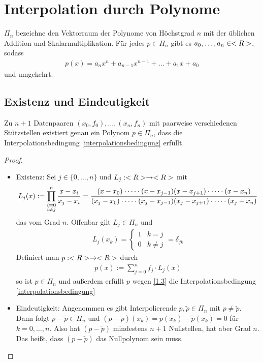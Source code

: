 \section{Interpolation durch Polynome}

$\Pi_n$ bezeichne den Vektorraum der Polynome von Höchstgrad $n$ mit der üblichen Addition und Skalarmultiplikation. Für jedes $p\in\Pi_n$ gibt es $a_0,\dots,a_n\in<R>$, sodass
\begin{align}
	p(x) = a_nx^n+a_{n-1}x^{n-1}+\dots+a_1x+a_0
\end{align}
und umgekehrt.

\subsection{Existenz und Eindeutigkeit}

\begin{proposition}
	Zu $n+1$ Datenpaaren $(x_0,f_0),\dots,(x_n,f_n)$ mit paarweise verschiedenen Stützstellen existiert genau ein Polynom $p\in\Pi_n$, dass die Interpolationsbedingung  \cref{interpolationsbedingung} erfüllt.
\end{proposition}
\begin{proof}
	\begin{itemize}
		\item Existenz: Sei $j\in\{0,\dots,n\}$ und $L_j:<R>\to<R>$ mit
		\begin{align}
			L_j(x) := \prod_{\substack{i=0\\ i\neq j}}^{n} \frac{x-x_i}{x_j-x_i}= \frac{(x-x_0)\cdot\dots\cdot(x-x_{j-1})(x-x_{j+1})\cdot\dots\cdot(x-x_n)} {(x_j-x_0)\cdot\dots\cdot(x_j-x_{j-1})(x_j-x_{j+1})\cdot\dots\cdot(x_j-x_n)}\notag
		\end{align}
		das  vom Grad $n$. Offenbar gilt $L_j\in\Pi_n$ und 
		\begin{align}
			\label{1.3}
			L_j(x_k)=\begin{cases}
				1 & k=j \\ 0 & k\neq j
			\end{cases} = \delta_{jk}
		\end{align}
		Definiert man $p:<R>\to<R>$ durch
		\begin{align}
			\label{1.4}
			p(x) := \sum_{j=0}^{n} f_j\cdot L_j(x)
		\end{align}
		so ist $p\in\Pi_n$ und außerdem erfüllt $p$ wegen \cref{1.3} die Interpolationsbedingung \cref{interpolationsbedingung}
		\item Eindeutigkeit: Angenommen es gibt Interpolierende $p,\tilde{p}\in\Pi_n$ mit $p\neq\tilde{p}$. Dann folgt $p-\tilde{p}\in\Pi_n$ und $(p-\tilde{p})(x_k)=p(x_k)-\tilde{p}(x_k)=0$ für $k=0,\dots,n$. Also hat $(p-\tilde{p})$ mindestens $n+1$ Nullstellen, hat aber Grad $n$. Das heißt, dass $(p-\tilde{p})$ das Nullpolynom sein muss.
	\end{itemize}
\end{proof}

